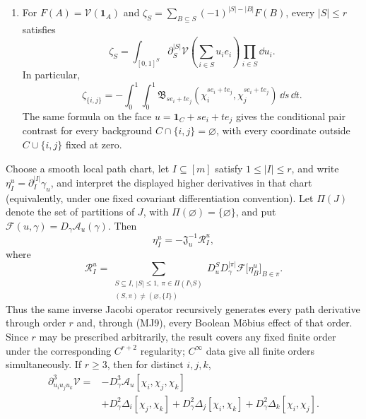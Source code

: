 \begin{theorem}
\begin{enumerate}[leftmargin=*,itemsep=0.35em]
  \item For \(F(A)=\mathcal V(\mathbf1_A)\) and
  \(\zeta_S=\sum_{B\subseteq S}(-1)^{|S|-|B|}F(B)\), every
  \(|S|\le r\) satisfies
  \begin{equation}
    \zeta_S
    =\int_{[0,1]^S}
    \partial_S^{|S|}\mathcal V
    \left(\sum_{i\in S}u_ie_i\right)\prod_{i\in S}\dd u_i.
    \tag{MJ9}
  \end{equation}
  In particular,
  \begin{equation}
  \boxed{
    \zeta_{\{i,j\}}
    =-\int_0^1\!\int_0^1
    \mathfrak B_{se_i+te_j}
    (\chi_i^{se_i+te_j},\chi_j^{se_i+te_j})\,\dd s\,\dd t.}
    \tag{MJ10}
  \end{equation}
  The same formula on the face
  \(u=\mathbf1_C+se_i+te_j\) gives the conditional pair contrast for every
  background \(C\cap\{i,j\}=\varnothing\), with every coordinate outside
  \(C\cup\{i,j\}\) fixed at zero.
\end{enumerate}
\end{theorem}

\begin{corollary}
\label{cor:all-order-mobius-jacobi}
Choose a smooth local path chart, let \(I\subseteq[m]\) satisfy
\(1\le|I|\le r\), and write
\(\eta_I^u=\partial_I^{|I|}\gamma_u\), and interpret the displayed higher
derivatives in that chart (equivalently, under one fixed covariant
differentiation convention).  Let \(\Pi(J)\) denote the set of
partitions of \(J\), with \(\Pi(\varnothing)=\{\varnothing\}\), and put
\(\mathscr F(u,\gamma)=D_\gamma\mathcal A_u(\gamma)\).  Then
\begin{equation}
  \eta_I^u=-\mathfrak J_u^{-1}\mathcal R_I^u,
  \tag{MJ11}
\end{equation}
where
\begin{equation}
  \mathcal R_I^u
  =\sum_{\substack{S\subseteq I,\ |S|\le1,\ \pi\in\Pi(I\setminus S)\\
  (S,\pi)\ne(\varnothing,\{I\})}}
  D_u^S D_\gamma^{|\pi|}\mathscr F
  \bigl[\eta_B^u\bigr]_{B\in\pi}.
  \tag{MJ12}
\end{equation}
Thus the same inverse Jacobi operator recursively generates every path
derivative through order \(r\) and, through (MJ9), every Boolean M\"obius
effect of that order.  Since \(r\) may be prescribed arbitrarily, the result
covers any fixed finite order under the corresponding \(C^{r+2}\) regularity;
\(C^\infty\) data give all finite orders simultaneously.  If \(r\ge3\), then
for distinct \(i,j,k\),
\begin{equation}
  \boxed{
  \begin{aligned}
  \partial_{u_i u_j u_k}^3\mathcal V
  ={}&-D_\gamma^3\mathcal A_u[\chi_i,\chi_j,\chi_k]\\
  &+D_\gamma^2\Delta_i[\chi_j,\chi_k]
  +D_\gamma^2\Delta_j[\chi_i,\chi_k]
  +D_\gamma^2\Delta_k[\chi_i,\chi_j].
  \end{aligned}}
  \tag{MJ13}
\end{equation}
\end{corollary}


